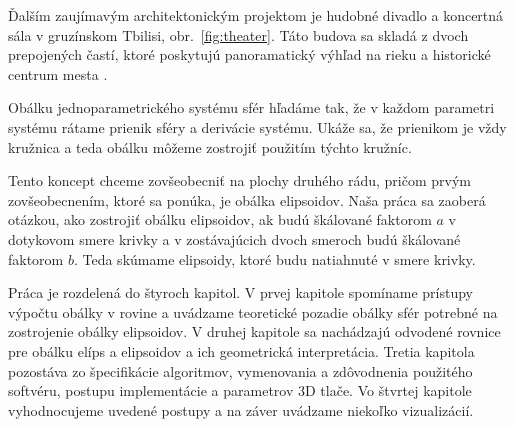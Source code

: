 
Ďalším zaujímavým architektonickým projektom je hudobné divadlo a koncertná sála v gruzínskom Tbilisi, obr.~\ref{fig:theater}. Táto budova sa skladá z dvoch prepojených častí, ktoré poskytujú panoramatický výhľad na rieku a historické centrum mesta \cite{Mesz18}.

Obálku jednoparametrického systému sfér hľadáme tak, že v každom parametri systému rátame prienik sféry a derivácie systému. Ukáže sa, že prienikom je vždy kružnica a teda obálku môžeme zostrojiť použitím týchto kružníc. 

Tento koncept chceme zovšeobecniť na plochy druhého rádu, pričom prvým zovšeobecnením, ktoré sa ponúka, je obálka elipsoidov. Naša práca sa zaoberá otázkou, ako zostrojiť obálku elipsoidov, ak budú škálované faktorom $a$ v dotykovom smere krivky a v zostávajúcich dvoch smeroch budú škálované faktorom $b$. Teda skúmame elipsoidy, ktoré budu natiahnuté v smere krivky.

Práca je rozdelená do štyroch kapitol. V prvej kapitole spomíname prístupy výpočtu obálky v rovine a uvádzame teoretické pozadie obálky sfér potrebné na zostrojenie obálky elipsoidov. V druhej kapitole sa nachádzajú odvodené rovnice pre obálku elíps a elipsoidov a ich geometrická interpretácia. Tretia kapitola pozostáva zo špecifikácie algoritmov, vymenovania a zdôvodnenia použitého softvéru, postupu implementácie a parametrov 3D tlače. Vo štvrtej kapitole vyhodnocujeme uvedené postupy a na záver uvádzame niekoľko vizualizácií.